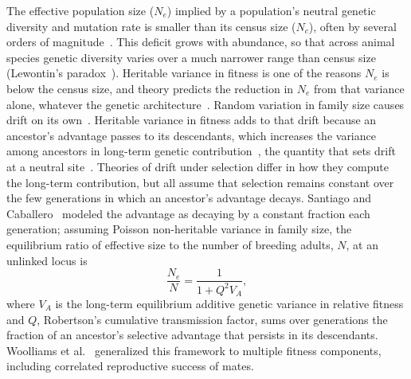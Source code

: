 \documentclass{article}
\begin{document}
The effective population size ($N_e$) implied by a population's neutral genetic diversity and mutation rate is smaller than its census size ($N_c$), often by several orders of magnitude~\cite{buffalo2021,lewin2026}. This deficit grows with abundance, so that across animal species genetic diversity varies over a much narrower range than census size (Lewontin's paradox~\cite{lewontin1974,leffler2012}). Heritable variance in fitness is one of the reasons $N_e$ is below the census size, and theory predicts the reduction in $N_e$ from that variance alone, whatever the genetic architecture~\cite{robertson1961,santiago1995}. Random variation in family size causes drift on its own~\cite{wright1938}. Heritable variance in fitness adds to that drift because an ancestor's advantage passes to its descendants, which increases the variance among ancestors in long-term genetic contribution~\cite{robertson1961}, the quantity that sets drift at a neutral site~\cite{wray1990}. Theories of drift under selection differ in how they compute the long-term contribution, but all assume that selection remains constant over the few generations in which an ancestor's advantage decays. Santiago and Caballero~\cite{santiago1995,santiago1998} modeled the advantage as decaying by a constant fraction each generation; assuming Poisson non-heritable variance in family size, the equilibrium ratio of effective size to the number of breeding adults, $N$, at an unlinked locus is
\begin{equation}
    \frac{N_e}{N} = \frac{1}{1 + Q^2 V_A}, \label{eq:intro_sc}
\end{equation}
where $V_A$ is the long-term equilibrium additive genetic variance in relative fitness and $Q$, Robertson's cumulative transmission factor, sums over generations the fraction of an ancestor's selective advantage that persists in its descendants. Woolliams et al.~\cite{woolliams1993,woolliams1999} generalized this framework to multiple fitness components, including correlated reproductive success of mates.
\end{document}
